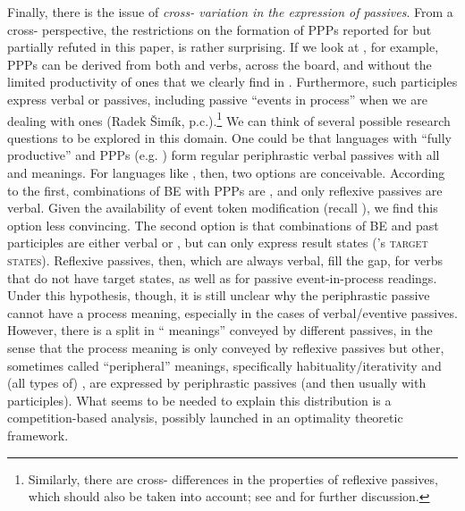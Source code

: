 \documentclass[output=paper,modfonts,newtxmath,hidelinks
\ChapterDOI{10.5281/zenodo.2545513}
]{langscibook}
\begin{document}
Finally, there is the issue of \textit{cross- variation in the expression of passives}. From a cross- perspective, the  restrictions on the formation of PPPs reported for  but partially refuted in this paper, is rather surprising. If we look at , for example, PPPs can be derived from both  and  verbs, across the board, and without the limited productivity of  ones that we clearly find in . Furthermore, such participles express verbal or  passives, including passive ``events in process'' when we are dealing with  ones (Radek Šimík, p.c.).\footnote{Similarly, there are cross- differences in the properties of reflexive passives, which should also be taken into account; see \citet{fehrmann+10} and \citet{schaefer16} for further discussion.} We can think of several possible research questions to be explored in this domain. One could be that languages with ``fully productive''  and  PPPs (e.g. ) form regular periphrastic verbal passives with all  and  meanings. For languages like , then, two options are conceivable. According to the first, combinations of BE with PPPs are , and only reflexive passives are verbal. Given the availability of event token modification (recall ), we find this option less convincing. The second option is that combinations of BE and past participles are either verbal or , but can only express result states (\citeauthor{kratzer00}'s \citeyear{kratzer00} \textsc{target states}). Reflexive passives, then, which are always verbal, fill the gap, for verbs that do not have target states, as well as for passive event-in-process readings. Under this hypothesis, though, it is still unclear why the  periphrastic passive cannot have a process meaning, especially in the cases of verbal/eventive passives. However, there is a split in `` meanings'' conveyed by different passives, in the sense that the process meaning is only conveyed by reflexive passives but other, sometimes called ``peripheral''  meanings, specifically habituality/iterativity and (all types of) , are expressed by periphrastic passives (and then usually with  participles). What seems to be needed to explain this distribution is a competition-based analysis, possibly launched in an optimality theoretic framework. 
\end{document}
